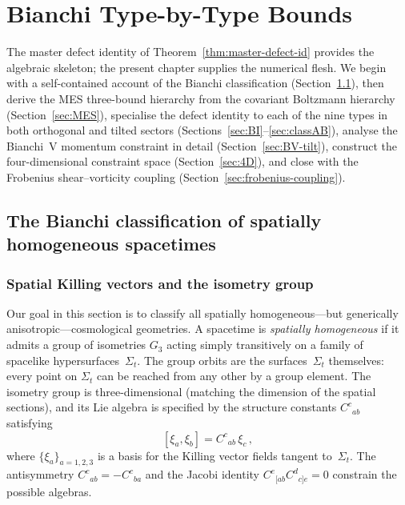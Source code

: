 
\chapter{Bianchi Type-by-Type Bounds}\label{ch:bianchi-bounds}

The master defect identity of Theorem~\ref{thm:master-defect-id}
provides the algebraic skeleton; the present chapter supplies the
numerical flesh.  We begin with a self-contained account of the
Bianchi classification (Section~\ref{sec:bianchi-class}), then
derive the MES three-bound hierarchy from the covariant Boltzmann
hierarchy (Section~\ref{sec:MES}), specialise the defect identity
to each of the nine types in both orthogonal and tilted sectors
(Sections~\ref{sec:BI}--\ref{sec:classAB}), analyse the Bianchi~V
momentum constraint in detail
(Section~\ref{sec:BV-tilt}), construct the four-dimensional
constraint space (Section~\ref{sec:4D}), and close with the
Frobenius shear--vorticity coupling
(Section~\ref{sec:frobenius-coupling}).


\section{The Bianchi classification of spatially homogeneous
  spacetimes}\label{sec:bianchi-class}

\subsection{Spatial Killing vectors and the isometry group}
\label{sec:killing}

Our goal in this section is to classify all spatially
homogeneous---but generically anisotropic---cosmological
geometries.  A spacetime is \emph{spatially homogeneous} if it
admits a group of isometries $G_3$ acting simply transitively
on a family of spacelike hypersurfaces~$\Sigma_t$.  The group
orbits are the surfaces~$\Sigma_t$ themselves: every point on
$\Sigma_t$ can be reached from any other by a group element.  The
isometry group is three-dimensional (matching the dimension of
the spatial sections), and its Lie algebra is specified by the
structure constants $C^c{}_{ab}$ satisfying
\begin{equation}\label{eq:lie-bracket}
[\xi_a, \xi_b] = C^c{}_{ab}\,\xi_c\,,
\end{equation}
where $\{\xi_a\}_{a=1,2,3}$ is a basis for the Killing vector
fields tangent to~$\Sigma_t$.  The antisymmetry
$C^c{}_{ab} = -C^c{}_{ba}$ and the Jacobi identity
$C^e{}_{[ab}C^d{}_{c]e} = 0$ constrain the possible algebras.


